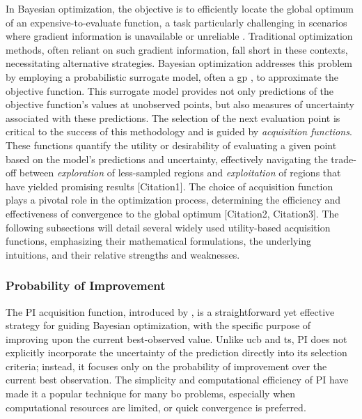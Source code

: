 In Bayesian optimization, the objective is to efficiently locate the global optimum of an expensive-to-evaluate function, a task particularly challenging in scenarios where gradient information is unavailable or unreliable \citep{mockus1978application,jones1998efficient}. Traditional optimization methods, often reliant on such gradient information, fall short in these contexts, necessitating alternative strategies. Bayesian optimization addresses this problem by employing a probabilistic surrogate model, often a \acf{gp} \citep{rasmussen2006gaussian}, to approximate the objective function. This surrogate model provides not only predictions of the objective function's values at unobserved points, but also measures of uncertainty associated with these predictions. The selection of the next evaluation point is critical to the success of this methodology and is guided by \textit{acquisition functions}. These functions quantify the utility or desirability of evaluating a given point based on the model’s predictions and uncertainty, effectively navigating the trade-off between \textit{exploration} of less-sampled regions and \textit{exploitation} of regions that have yielded promising results [Citation1].  The choice of acquisition function plays a pivotal role in the optimization process, determining the efficiency and effectiveness of convergence to the global optimum [Citation2, Citation3]. The following subsections will detail several widely used utility-based acquisition functions, emphasizing their mathematical formulations, the underlying intuitions, and their relative strengths and weaknesses.
\subsubsection{Probability of Improvement}
\label{section:pi}

The \ac{PI} acquisition function, introduced by \citet{kushner1964new}, is a straightforward yet effective strategy for guiding Bayesian optimization, with the specific purpose of improving upon the current best-observed value. Unlike \ac{ucb} and \ac{ts}, \ac{PI} does not explicitly incorporate the uncertainty of the prediction directly into its selection criteria; instead, it focuses only on the probability of improvement over the current best observation. The simplicity and computational efficiency of \ac{PI} have made it a popular technique for many \ac{bo} problems, especially when computational resources are limited, or quick convergence is preferred.

